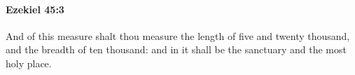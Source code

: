
		\paragraph{Ezekiel 45:3} %
			\label{EZEKIEL-45-3}

			And of this measure shalt thou measure the length of five and twenty thousand, and the breadth of ten thousand: and in it shall be the sanctuary and the most holy place.


